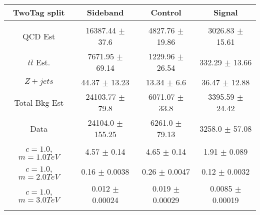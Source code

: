 \begin{footnotesize} 
\begin{tabular}{c|c|c|c} 
TwoTag split & Sideband & Control & Signal \\ 
\hline\hline 
& & & \\ 
QCD Est & 16387.44 $\pm$ 37.6 & 4827.76 $\pm$ 19.86 & 3026.83 $\pm$ 15.61\\ 
$t\bar{t}$ Est.  & 7671.95 $\pm$ 69.14 & 1229.96 $\pm$ 26.54 & 332.29 $\pm$ 13.66\\ 
$Z+jets$ & 44.37 $\pm$ 13.23 & 13.34 $\pm$ 6.6 & 36.47 $\pm$ 12.88\\ 
Total Bkg Est & 24103.77 $\pm$ 79.8 & 6071.07 $\pm$ 33.8 & 3395.59 $\pm$ 24.42\\ 
Data & 24104.0 $\pm$ 155.25 & 6261.0 $\pm$ 79.13 & 3258.0 $\pm$ 57.08\\ 
$c=1.0$,$m=1.0TeV$ & 4.57 $\pm$ 0.14 & 4.65 $\pm$ 0.14 & 1.91 $\pm$ 0.089\\ 
$c=1.0$,$m=2.0TeV$ & 0.16 $\pm$ 0.0038 & 0.26 $\pm$ 0.0047 & 0.12 $\pm$ 0.0032\\ 
$c=1.0$,$m=3.0TeV$ & 0.012 $\pm$ 0.00024 & 0.019 $\pm$ 0.00029 & 0.0085 $\pm$ 0.00019\\ 
& & & \\ 
\hline\hline 
\end{tabular} 
\end{footnotesize} 
\newline 
